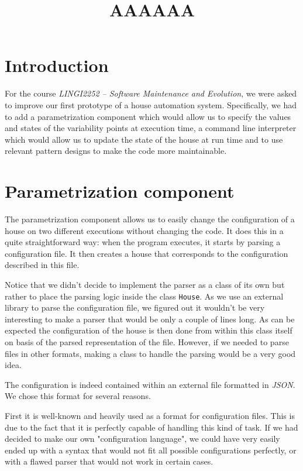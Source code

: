     \title{AAAAAA}
    \newpage

	\section{Introduction}
		For the course \textit{LINGI2252 -- Software Maintenance and Evolution}, we were asked to improve our first prototype of a house automation system. Specifically, we had to add a parametrization component which would allow us to specify the values and states of the variability points at execution time, a command line interpreter which would allow us to update the state of the house at run time and to use relevant pattern designs to make the code more maintainable.
		
	\section{Parametrization component}
		The parametrization component allows us to easily change the configuration of a house on two different executions without changing the code.
		It does this in a quite straightforward way: when the program executes, it starts by parsing a configuration file. It then creates a house that corresponds to the configuration described in this file.
		
		Notice that we didn't decide to implement the parser as a class of its own but rather to place the parsing logic inside the class \texttt{House}. As we use an external library to parse the configuration file, we figured out it wouldn't be very interesting to make a parser that would be only a couple of lines long. As can be expected the configuration of the house is then done from within this class itself on basis of the parsed representation of the file. However, if we needed to parse files in other formats, making a class to handle the parsing would be a very good idea.
		
		The configuration is indeed contained within an external file formatted in \textit{JSON}.
		We chose this format for several reasons.
		
		First it is well-known and heavily used as a format for configuration files. This is due to the fact that it is perfectly capable of handling this kind of task. If we had decided to make our own "configuration language", we could have very easily ended up with a syntax that would not fit all possible configurations perfectly, or with a flawed parser that would not work in certain cases.

